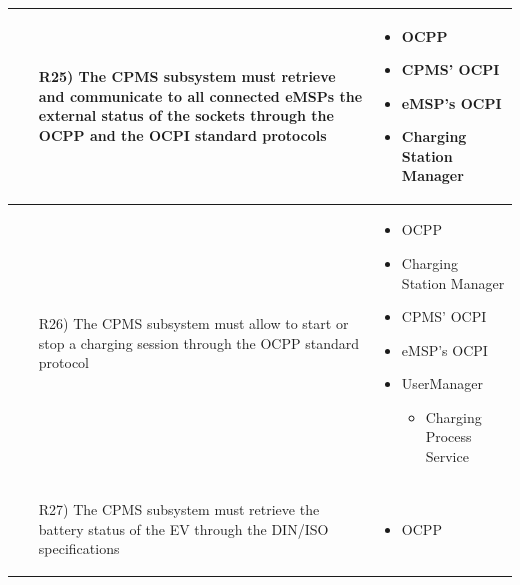 \documentclass[table, 12pt]{article}
\begin{document}
\begin{longtable}{|p{}|p{}|}
    \begin{itemize}
        \item[R25)] The CPMS subsystem must retrieve and communicate to all connected eMSPs the external status of the sockets through the OCPP and the OCPI standard protocols
    \end{itemize}
    & 
    \begin{itemize}
        \item OCPP
        \item CPMS' OCPI
        \item eMSP's OCPI
        \item Charging Station Manager
    \end{itemize}
    \\\hline

    \begin{itemize}
        \item[R26)] The CPMS subsystem must allow to start or stop a charging session through the OCPP standard protocol
    \end{itemize}
    & 
    \begin{itemize}
        \item OCPP
        \item Charging Station Manager
        \item CPMS' OCPI
        \item eMSP's OCPI
        \item UserManager
        \begin{itemize}\setlength{\itemindent}{-5px}
            \item Charging Process Service
        \end{itemize}
    \end{itemize}
    \\\hline

    \begin{itemize}
        \item[R27)] The CPMS subsystem must retrieve the battery status of the EV through the DIN/ISO specifications
    \end{itemize}
        & 
    \begin{itemize}
        \item OCPP
    \end{itemize}
    \\\hline


\end{longtable}
\end{document}
